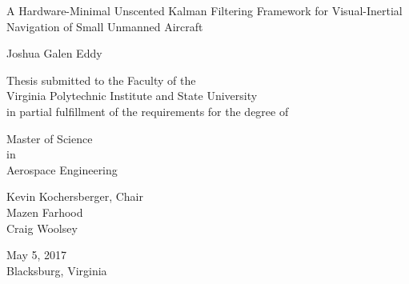 \thispagestyle{empty}

\begin{center}
\begin{doublespacing}
{\Large 
A Hardware-Minimal Unscented Kalman Filtering Framework for Visual-Inertial Navigation of Small Unmanned Aircraft
}
\vfill
\end{doublespacing}

Joshua Galen Eddy

\vfill

Thesis submitted to the Faculty of the \\
Virginia Polytechnic Institute and State University \\
in partial fulfillment of the requirements for the degree of

\vfill

Master of Science \\
in \\
Aerospace Engineering

\vfill

Kevin Kochersberger, Chair \\
Mazen Farhood \\
Craig Woolsey

\vfill

May 5, 2017 \\
Blacksburg, Virginia
\vfill
\end{center}

\pagebreak